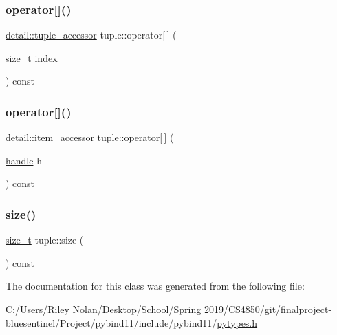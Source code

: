 \mbox{\label{classtuple_aae04fa4cd62a8cb8834f4ce50a276688}} 
\subsubsection{\texorpdfstring{operator[]()}{operator[]()}\hspace{0.1cm}{\footnotesize\ttfamily [1/2]}}
{\footnotesize\ttfamily \mbox{\hyperlink{pytypes_8h_a2345c1cb65083637589e00a50f7b3876}{detail\+::tuple\+\_\+accessor}} tuple\+::operator\mbox{[}$\,$\mbox{]} (\begin{DoxyParamCaption}\item[{\mbox{\hyperlink{detail_2common_8h_a801d6a451a01953ef8cbae6feb6a3638}{size\+\_\+t}}}]{index }\end{DoxyParamCaption}) const\hspace{0.3cm}{\ttfamily [inline]}}

\mbox{\label{classtuple_a1a491611659e1556fa4ece44b495e9a0}} 
\subsubsection{\texorpdfstring{operator[]()}{operator[]()}\hspace{0.1cm}{\footnotesize\ttfamily [2/2]}}
{\footnotesize\ttfamily \mbox{\hyperlink{pytypes_8h_a9907d3edf962653e33d36bccc8b8a268}{detail\+::item\+\_\+accessor}} tuple\+::operator\mbox{[}$\,$\mbox{]} (\begin{DoxyParamCaption}\item[{\mbox{\hyperlink{classhandle}{handle}}}]{h }\end{DoxyParamCaption}) const\hspace{0.3cm}{\ttfamily [inline]}}

\mbox{\label{classtuple_ab962c5f22da58f5d94f2107bec093f81}} 
\subsubsection{\texorpdfstring{size()}{size()}}
{\footnotesize\ttfamily \mbox{\hyperlink{detail_2common_8h_a801d6a451a01953ef8cbae6feb6a3638}{size\+\_\+t}} tuple\+::size (\begin{DoxyParamCaption}{ }\end{DoxyParamCaption}) const\hspace{0.3cm}{\ttfamily [inline]}}



The documentation for this class was generated from the following file\+:\begin{DoxyCompactItemize}
\item 
C\+:/\+Users/\+Riley Nolan/\+Desktop/\+School/\+Spring 2019/\+C\+S4850/git/finalproject-\/bluesentinel/\+Project/pybind11/include/pybind11/\mbox{\hyperlink{pytypes_8h}{pytypes.\+h}}\end{DoxyCompactItemize}
